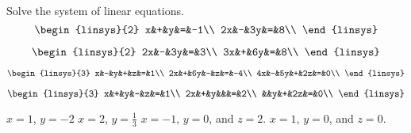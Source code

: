 

\begin{Exercise}[
name={},
title={}, 
difficulty=0,
origin={\cite{GH}}]
Solve the system of linear equations.
\Question
\[
\begin{linsys}{2}
x&+&y&=&-1\\
2x&-&3y&=&8\\
\end{linsys}
\]

\Question
\[
\begin{linsys}{2}
2x&-&3y&=&3\\
3x&+&6y&=&8\\
\end{linsys}
\]

\Question
\[
\begin{linsys}{3}
x&-&y&+&z&=&1\\
2x&+&6y&-&z&=&-4\\
4x&-&5y&+&2z&=&0\\
\end{linsys}
\]

\Question
\[
\begin{linsys}{3}
x&+&y&-&z&=&1\\
2x&+&y&&&=&2\\
&&y&+&2z&=&0\\
\end{linsys}
\]

\end{Exercise}

\begin{Answer}
\Question $x=1$, $y=-2$
\Question $x=2$, $y=\frac13$
\Question $x=-1$, $y=0$, and $z=2$.
\Question $x=1$, $y=0$, and $z=0$.
\end{Answer}
